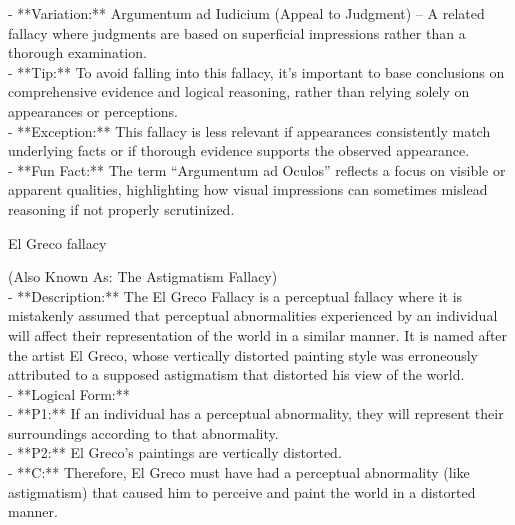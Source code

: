 \documentclass[a4paper,12pt,single,pdftex]{scrartcl}
\begin{document}
{    
      - **Variation:** Argumentum ad Iudicium (Appeal to Judgment) – A related fallacy where judgments are based on superficial impressions rather than a thorough examination.
    \\

    
      - **Tip:** To avoid falling into this fallacy, it’s important to base conclusions on comprehensive evidence and logical reasoning, rather than relying solely on appearances or perceptions.
    \\

    
      - **Exception:** This fallacy is less relevant if appearances consistently match underlying facts or if thorough evidence supports the observed appearance.
    \\

    
      - **Fun Fact:** The term “Argumentum ad Oculos” reflects a focus on visible or apparent qualities, highlighting how visual impressions can sometimes mislead reasoning if not properly scrutinized.
    \\

  }


El Greco fallacy
    
      (Also Known As: The Astigmatism Fallacy)
    \\

  
    
      - **Description:** The El Greco Fallacy is a perceptual fallacy where it is mistakenly assumed that perceptual abnormalities experienced by an individual will affect their representation of the world in a similar manner. It is named after the artist El Greco, whose vertically distorted painting style was erroneously attributed to a supposed astigmatism that distorted his view of the world.
    \\

    
      - **Logical Form:**
    \\

    
        - **P1:** If an individual has a perceptual abnormality, they will represent their surroundings according to that abnormality.
    \\

    
        - **P2:** El Greco's paintings are vertically distorted.
    \\

    
        - **C:** Therefore, El Greco must have had a perceptual abnormality (like astigmatism) that caused him to perceive and paint the world in a distorted manner.
    \\
\end{document}

